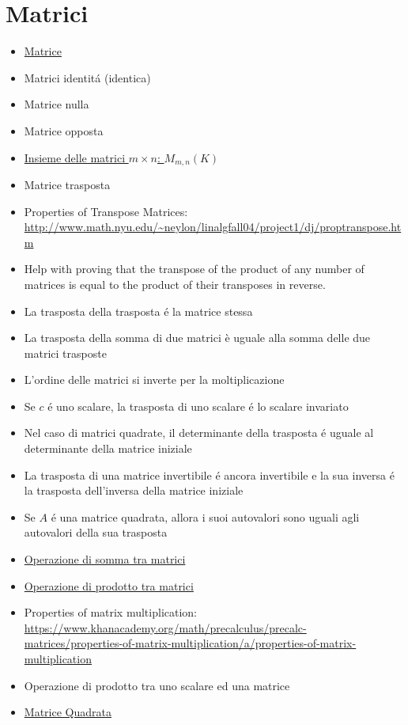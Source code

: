 \documentclass[a4paper,10pt]{article}
\begin{document}
\section{Matrici}
\begin{itemize}
   \item \href{Matrice.html}{Matrice}
   \item Matrici identit\'{a} (identica)
   \item Matrice nulla
   \item Matrice opposta 
   \item \href{InsiemeDelleMatrici.html}{Insieme delle matrici $m \times n$: $M_{m,n}(K)$}
   \item Matrice trasposta
   \item Properties of Transpose Matrices: \url{http://www.math.nyu.edu/~neylon/linalgfall04/project1/dj/proptranspose.htm}
   \item Help with proving that the transpose of the product of any number of matrices is equal to the product of their transposes in reverse.
   \item La trasposta della trasposta \'{e} la matrice stessa
   \item La trasposta della somma di due matrici è uguale alla somma delle due matrici trasposte
   \item L'ordine delle matrici si inverte per la moltiplicazione
   \item Se $c$ \'{e} uno scalare, la trasposta di uno scalare \'{e} lo scalare invariato
   \item Nel caso di matrici quadrate, il determinante della trasposta \'{e} uguale al determinante della matrice iniziale
   \item La trasposta di una matrice invertibile \'{e} ancora invertibile e la sua inversa \'{e} la trasposta dell'inversa della matrice iniziale
   \item Se $A$ \'{e} una matrice quadrata, allora i suoi autovalori sono uguali agli autovalori della sua trasposta
   \item \href{SommaMatrici.html}{Operazione di somma tra matrici}
   \item \href{ProdottoMatrici.html}{Operazione di prodotto tra matrici}
   \item Properties of matrix multiplication: \url{https://www.khanacademy.org/math/precalculus/precalc-matrices/properties-of-matrix-multiplication/a/properties-of-matrix-multiplication}
   \item Operazione di prodotto tra uno scalare ed una matrice
   \item \href{MatriceQuadrata.html}{Matrice Quadrata}

\end{itemize}
\end{document}
